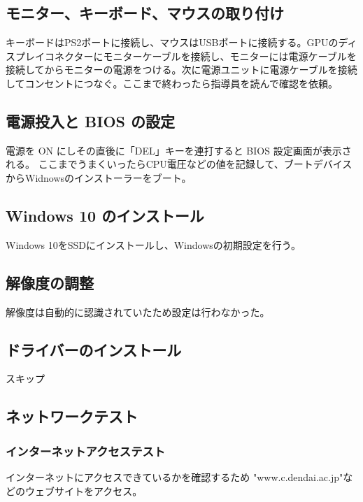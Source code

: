 \documentclass[10pt]{article}
\begin{document}
\subsection{モニター、キーボード、マウスの取り付け}
\hspace{1cm}キーボードはPS2ポートに接続し、マウスはUSBポートに接続する。GPUのディスプレイコネクターにモニターケーブルを接続し、モニターには電源ケーブルを接続してからモニターの電源をつける。次に電源ユニットに電源ケーブルを接続してコンセントにつなぐ。ここまで終わったら指導員を読んで確認を依頼。


\subsection{ 電源投入と BIOS の設定}
\hspace{1cm}			
 電源を ON にしその直後に「DEL」キーを連打すると BIOS 設定画面が表示される。 ここまでうまくいったらCPU電圧などの値を記録して、ブートデバイスからWidnowsのインストーラーをブート。

\subsection{Windows 10 のインストール}
\hspace{1cm}Windows 10をSSDにインストールし、Windowsの初期設定を行う。

\subsection{解像度の調整}
\hspace{1cm}解像度は自動的に認識されていたため設定は行わなかった。

\subsection{ドライバーのインストール}
\hspace{1cm} スキップ

\subsection{ネットワークテスト}
\hspace{1cm}
\subsubsection{インターネットアクセステスト}
	インターネットにアクセスできているかを確認するため "www.c.dendai.ac.jp"などのウェブサイトをアクセス。 
\end{document}
